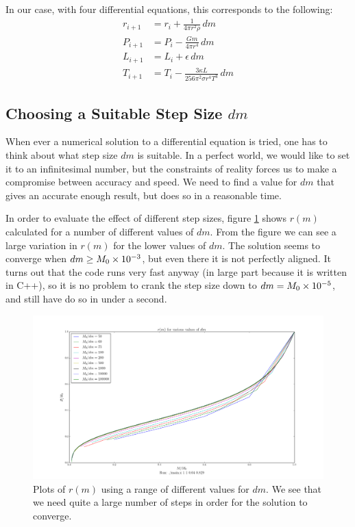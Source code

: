 \documentclass[11pt,twocolumn]{article}
\begin{document}
In our case, with four differential equations, this corresponds to the
following:
\begin{align*}
  r_{i+1} &= r_i +  \frac{ 1 }{ 4\pi r^2\rho }\,dm\\
  P_{i+1} &= P_{i} - \frac{ Gm }{ 4\pi r^4 }\,dm\\
  L_{i+1} &= L_i + \epsilon\,dm\\
  T_{i+1} &= T_i - \frac{ 3\kappa L }{ 256 \pi^2 \sigma r^4T^3 }\,dm
\end{align*}

\subsection{Choosing a Suitable Step Size $dm$}
When ever a numerical solution to a differential equation is tried,
one has to think about what step size $dm$ is suitable. In a perfect
world, we would like to set it to an infinitesimal number, but the
constraints of reality forces us to make a compromise between accuracy
and speed. We need to find a value for $dm$ that gives an accurate
enough result, but does so in a reasonable time. 

In order to evaluate the effect of different step sizes, figure
\ref{fig:dm-variation-no-dss} shows $r(m)$ calculated for a number of
different values of $dm$. From the figure we can see a large variation
in $r(m)$ for the lower values of $dm$. The solution seems to converge
when $dm \geq M_0\times 10^{-3}$, but even there it is not perfectly
aligned. It turns out that the code runs very fast anyway (in large
part because it is written in C++), so it is no problem to crank the
step size down to $dm= M_0\times 10^{-5}$, and still have do so in under a
second. 

\begin{figure}[ht]
  \centering
  \includegraphics[width=\linewidth]{fig/dm_variation_no_dss.png}
  \caption{\label{fig:dm-variation-no-dss} Plots of $r(m)$ using a
    range of different values for $dm$. We see that we need quite a
    large number of steps in order for the solution to converge.}
\end{figure}
\end{document}
